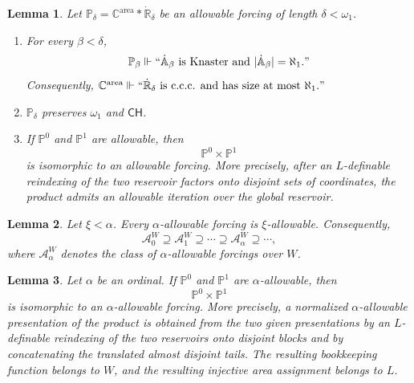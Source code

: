 \documentclass[10pt,a4paper]{amsart}
\newtheorem{lemma}{Lemma}
\newcommand{\CH}{\mathsf{CH}}
\newcommand{\forceA}{\mathbb{A}}
\newcommand{\forceC}{\mathbb{C}}
\newcommand{\forceP}{\mathbb{P}}
\newcommand{\forceR}{\mathbb{R}}
\begin{document}
\begin{lemma}
\label{basic-properties-allowable-forcings}
Let $\forceP_\delta=\forceC^{\mathrm{area}}*\dot{\forceR}_\delta$ be an
allowable forcing of length $\delta<\omega_1$.
\begin{enumerate}
   \item For every $\beta<\delta$,
   \[
      \forceP_\beta\Vdash
      ``\dot{\forceA}_\beta\text{ is Knaster and }
      |\dot{\forceA}_\beta|=\aleph_1."
   \]
   Consequently,
   $\forceC^{\mathrm{area}}\Vdash
   ``\dot{\forceR}_\delta\text{ is c.c.c. and has size at most }
   \aleph_1."$

   \item $\forceP_\delta$ preserves $\omega_1$ and $\CH$.

   \item If $\forceP^0$ and $\forceP^1$ are allowable, then
   \[
      \forceP^0\times\forceP^1
   \]
   is isomorphic to an allowable forcing.  More precisely, after an
   $L$-definable reindexing of the two reservoir factors onto disjoint
   sets of coordinates, the product admits an allowable iteration over the
   global reservoir.
\end{enumerate}
\end{lemma}

\begin{lemma}
\label{shrinkinglemma}
Let $\xi<\alpha$.  Every $\alpha$-allowable forcing is $\xi$-allowable.  Consequently,
\[
   \mathcal A^W_0\supseteq\mathcal A^W_1\supseteq\cdots
   \supseteq\mathcal A^W_\alpha\supseteq\cdots,
\]
where $\mathcal A^W_\alpha$ denotes the class of $\alpha$-allowable forcings over $W$.
\end{lemma}

\begin{lemma}
\label{1allowableclosedunderproducts}
\label{alphaallowableclosedunderproducts}
Let $\alpha$ be an ordinal.  If $\forceP^0$ and $\forceP^1$ are
$\alpha$-allowable, then
\[
   \forceP^0\times\forceP^1
\]
is isomorphic to an $\alpha$-allowable forcing.  More precisely, a normalized
$\alpha$-allowable presentation of the product is obtained from the two given
presentations by an $L$-definable reindexing of the two reservoirs onto
disjoint blocks and by concatenating the translated almost disjoint tails.  The
resulting bookkeeping function belongs to $W$, and the resulting injective area
assignment belongs to $L$.
\end{lemma}
\end{document}
